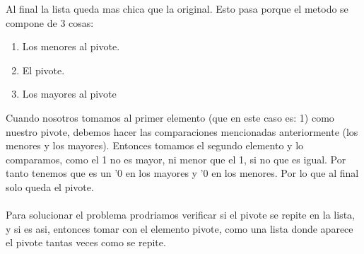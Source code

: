 \documentclass[12pt]{exam}
\begin{document}
\begin{enumerate}
\justifying
Al final la lista queda mas chica que la original. Esto pasa porque el metodo se compone de 3 cosas:

\begin{enumerate}
    \item Los menores al pivote.
    \item El pivote.
    \item Los mayores al pivote
\end{enumerate}

\justifying
Cuando nosotros tomamos al primer elemento (que en este caso es: 1) como nuestro pivote, debemos hacer las comparaciones mencionadas anteriormente (los menores y los mayores). Entonces tomamos el segundo elemento y lo comparamos, como el 1 no es mayor, ni menor que el 1, si no que es igual. Por tanto tenemos que es un '0 en los mayores y '0 en los menores. Por lo que al final solo queda el pivote.
\\
\\
\justifying
Para solucionar el problema prodriamos verificar si el pivote se repite en la lista, y si es asi, entonces tomar con el elemento pivote, como una lista donde aparece el pivote tantas veces como se repite.

\end{enumerate}
\end{document}
